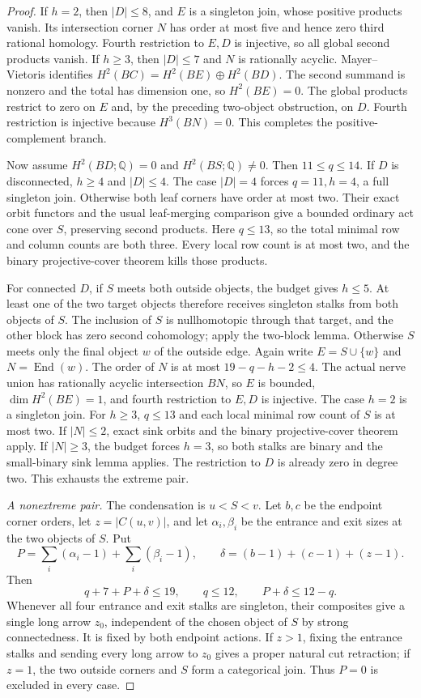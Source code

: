 \begin{proof}
If $h=2$, then $|D|\le8$, and $E$ is a singleton join, whose
positive products vanish. Its intersection corner $N$ has order
at most five and hence zero third rational homology. Fourth
restriction to $E,D$ is injective, so all global second products
vanish. If $h\ge3$, then $|D|\le7$ and $N$ is rationally
acyclic. Mayer--Vietoris identifies
$H^2(BC)=H^2(BE)\oplus H^2(BD)$. The second summand is nonzero
and the total has dimension one, so $H^2(BE)=0$. The global
products restrict to zero on $E$ and, by the preceding two-object
obstruction, on $D$. Fourth restriction is injective because
$H^3(BN)=0$. This completes the positive-complement branch.

Now assume $H^2(BD;\mathbb Q)=0$ and
$H^2(BS;\mathbb Q)\ne0$. Then $11\le q\le14$.
If $D$ is disconnected, $h\ge4$ and $|D|\le4$.
The case $|D|=4$ forces $q=11,h=4$, a full singleton join.
Otherwise both leaf corners have order at most two. Their exact
orbit functors and the usual leaf-merging comparison give a
bounded ordinary act cone over $S$, preserving second products.
Here $q\le13$, so the total minimal row and column counts are
both three. Every local row count is at most two, and the
binary projective-cover theorem kills those products.

For connected $D$, if $S$ meets both outside objects, the budget
gives $h\le5$. At least one of the two target objects therefore
receives singleton stalks from both objects of $S$. The inclusion
of $S$ is nullhomotopic through that target, and the other block
has zero second cohomology; apply the two-block lemma.
Otherwise $S$ meets only the final object $w$ of the outside edge.
Again write $E=S\cup\{w\}$ and $N=\operatorname{End}(w)$.
The order of $N$ is at most $19-q-h-2\le4$. The actual nerve
union has rationally acyclic intersection $BN$, so $E$ is bounded,
$\dim H^2(BE)=1$, and fourth restriction to $E,D$ is injective.
The case $h=2$ is a singleton join. For $h\ge3$, $q\le13$
and each local minimal row count of $S$ is at most two. If
$|N|\le2$, exact sink orbits and the binary projective-cover
theorem apply. If $|N|\ge3$, the budget forces $h=3$, so both
stalks are binary and the small-binary sink lemma applies.
The restriction to $D$ is already zero in degree two. This
exhausts the extreme pair.

\emph{A nonextreme pair.} The condensation is $u<S<v$.
Let $b,c$ be the endpoint corner orders, let $z=|C(u,v)|$, and
let $\alpha_i,\beta_i$ be the entrance and exit sizes at the
two objects of $S$. Put
\[
 P=\sum_i(\alpha_i-1)+\sum_i(\beta_i-1),\qquad
 \delta=(b-1)+(c-1)+(z-1).
\]
Then
\[
 q+7+P+\delta\le19,\qquad q\le12,
 \qquad P+\delta\le12-q.
\]
Whenever all four entrance and exit stalks are singleton, their
composites give a single long arrow $z_0$, independent of the
chosen object of $S$ by strong connectedness. It is fixed by both
endpoint actions. If $z>1$, fixing the entrance stalks and sending
every long arrow to $z_0$ gives a proper natural cut retraction;
if $z=1$, the two outside corners and $S$ form a categorical join.
Thus $P=0$ is excluded in every case.


\end{proof}
